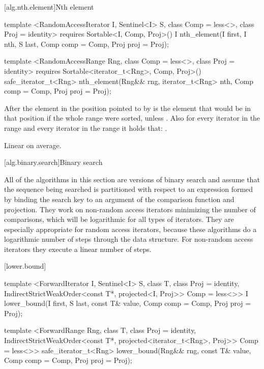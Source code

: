 [alg.nth.element]{Nth element}

%
\begin{itemdecl}
template <RandomAccessIterator I, Sentinel<I> S, class Comp = less<>,
    class Proj = identity>
  requires Sortable<I, Comp, Proj>()
  I nth_element(I first, I nth, S last, Comp comp = Comp{}, Proj proj = Proj{});

template <RandomAccessRange Rng, class Comp = less<>, class Proj = identity>
  requires Sortable<iterator_t<Rng>, Comp, Proj>()
  safe_iterator_t<Rng>
    nth_element(Rng&& rng, iterator_t<Rng> nth, Comp comp = Comp{}, Proj proj = Proj{});
\end{itemdecl}

\begin{itemdescr}
\pnum
After
the element in the position pointed to by 
is the element that would be
in that position if the whole range were sorted, unless .
Also for every iterator
in the range
and every iterator
in the range
it holds that:
.

\pnum
\complexity
Linear on average.
\end{itemdescr}

[alg.binary.search]{Binary search}

\pnum
All of the algorithms in this section are versions of binary search
and assume that the sequence being searched is partitioned with respect to
an expression formed by binding the search key to an argument of the
comparison function and projection.
They work on non-random access iterators minimizing the number of comparisons,
which will be logarithmic for all types of iterators.
They are especially appropriate for random access iterators,
because these algorithms do a logarithmic number of steps
through the data structure.
For non-random access iterators they execute a linear number of steps.

[lower.bound]{}

%
\begin{itemdecl}
template <ForwardIterator I, Sentinel<I> S, class T, class Proj = identity,
    IndirectStrictWeakOrder<const T*, projected<I, Proj>> Comp = less<>>
  I
    lower_bound(I first, S last, const T& value, Comp comp = Comp{},
                Proj proj = Proj{});

template <ForwardRange Rng, class T, class Proj = identity,
    IndirectStrictWeakOrder<const T*, projected<iterator_t<Rng>, Proj>> Comp = less<>>
  safe_iterator_t<Rng>
    lower_bound(Rng&& rng, const T& value, Comp comp = Comp{}, Proj proj = Proj{});
\end{itemdecl}

